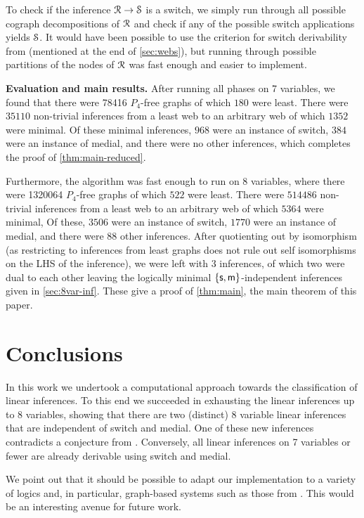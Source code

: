\documentclass[a4paper, UKenglish, cleveref]{lipics-v2019}
\begin{document}
To check if the inference \(\R \to \S\) is a switch, we simply run through all possible cograph decompositions of \(\R\) and check if any of the possible switch applications yields \(\S\).
It would have been possible to use the criterion for switch derivability from \cite{Str07:char-med} (mentioned at the end of \cref{sec:webs}), but running through possible partitions of the nodes of \(\R\) was fast enough and easier to implement.

\textbf{Evaluation and main results.}
After running all phases on 7 variables, we found that there were 78416 \(P_4\)-free graphs of which \(180\) were least. There were \(35110\) non-trivial inferences from a least web to an arbitrary web of which \(1352\) were minimal. Of these minimal inferences, \(968\) were an instance of switch, \(384\) were an instance of medial, and there were no other inferences, which completes the proof of \cref{thm:main-reduced}.

Furthermore, the algorithm was fast enough to run on 8 variables, where there were 1320064 \(P_4\)-free graphs of which \(522\) were least. There were \(514486\) non-trivial inferences from a least web to an arbitrary web of which \(5364\) were minimal, Of these, \(3506\) were an instance of switch, \(1770\) were an instance of medial, and there were \(88\) other inferences. After quotienting out by isomorphism (as restricting to inferences from least graphs does not rule out self isomorphisms on the LHS of the inference), we were left with \(3\) inferences, of which two were dual to each other leaving the logically minimal $\{\s,\m\}$-independent inferences given in \cref{sec:8var-inf}. These give a proof of \cref{thm:main}, the main theorem of this paper.



\section{Conclusions}
\label{sec:conclusions}
In this work we undertook a computational approach towards the classification of linear inferences.
To this end we succeeded in exhausting the linear inferences up to 8 variables, showing that there are two (distinct) 8 variable linear inferences that are independent of switch and medial.
One of these new inferences contradicts a conjecture from \cite[Conjecture 7.9]{DasStr16:no-compl-lin-sys}.
Conversely, all linear inferences on 7 variables or fewer are already derivable using switch and medial.


We point out that it should be possible to adapt our implementation to a variety of logics and, in particular, graph-based systems such as those from \cite{AccHorStr20:mll-graphs-short,AccHorStr20:mll-graphs-full,CalDasWar20:bgl}.
This would be an interesting avenue for future work.
\end{document}
